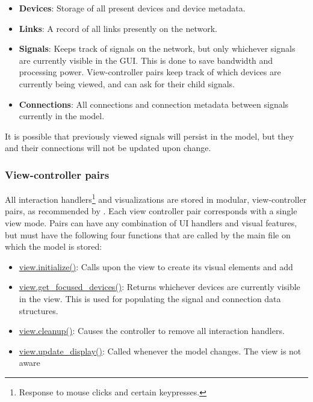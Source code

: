\begin{itemize}
 	\item \textbf{Devices}: Storage of all present devices and device metadata.
 	\item \textbf{Links}: A record of all links presently on the network.
 	\item \textbf{Signals}: Keeps track of signals on the network, but only whichever signals are currently visible in the GUI. This is done to save bandwidth and processing power. View-controller pairs keep track of which devices are currently being viewed, and can ask for their child signals. 
 	\item \textbf{Connections}: All connections and connection metadata between signals currently in the model.
 \end{itemize} 

It is possible that previously viewed signals will persist in the model, but they and their connections will not be updated upon change.

		\subsubsection{View-controller pairs}

All interaction handlers\footnote{Response to mouse clicks and certain keypresses.} and visualizations are stored in modular, view-controller pairs, as recommended by . Each view controller pair corresponds with a single view mode. Pairs can have any combination of UI handlers and visual features, but must have the following four functions that are called by the main file on which the model is stored:

\begin{itemize}
	\item \url{view.initialize()}: Calls upon the view to create its visual elements and add 
	\item \url{view.get_focused_devices()}: Returns whichever devices are currently visible in the view. This is used for populating the signal and connection data structures.
	\item \url{view.cleanup()}: Causes the controller to remove all interaction handlers.
	\item \url{view.update_display()}: Called whenever the model changes. The view is not aware
\end{itemize}


	


